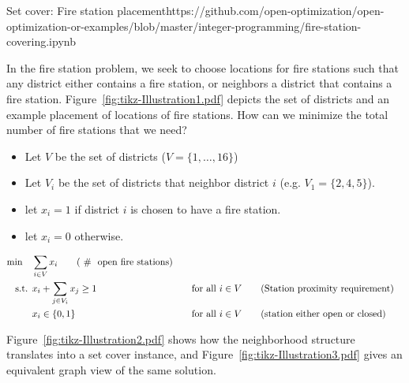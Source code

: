 \begin{examplewithcode}{Set cover: Fire station placement}{https://github.com/open-optimization/open-optimization-or-examples/blob/master/integer-programming/fire-station-covering.ipynb}
\label{example:fire-station}

In the fire station problem, we seek to choose locations for fire stations such that any district either contains a fire station, or neighbors a district that contains a fire station.  Figure~\ref{fig:tikz-Illustration1.pdf} depicts the set of districts and an example placement of locations of fire stations.  How can we minimize the total number of fire stations that we need?


\begin{itemize}
\item Let $V$ be the set of districts ($V = \{1, \dots, 16\}$)
\item Let $V_i$ be the set of districts that neighbor district $i$ (e.g. $V_1 = \{2,4,5\}$).
\end{itemize}

\begin{itemize}
\item let $x_i = 1$ if district $i$ is chosen to have a fire station.
\item let $x_i = 0$ otherwise.
\end{itemize}
\begin{align}
\min \quad & \sum_{i \in V} x_i \tag{ \# \text{ open fire stations}} \\
\st        & x_i + \sum_{j \in V_i} x_j \geq 1 &&\quad \text{for all } {i \in V}   \tag{Station proximity requirement} \\
& x_i \in \{0,1\} &&\quad \text{for all } i\in V   \tag{station either open or closed}
\end{align}
\end{examplewithcode}


Figure~\ref{fig:tikz-Illustration2.pdf} shows how the neighborhood structure translates into a set cover instance, and Figure~\ref{fig:tikz-Illustration3.pdf} gives an equivalent graph view of the same solution.


